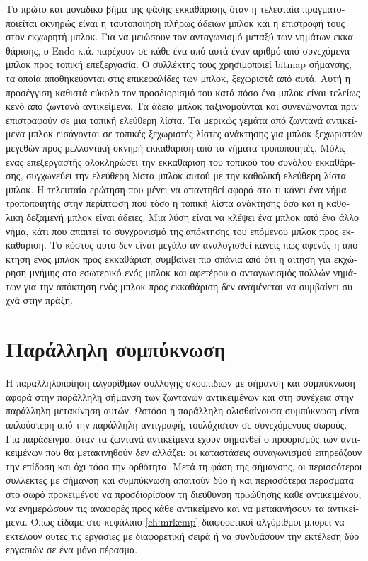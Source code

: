 \begin{greek}
Το πρώτο και μοναδικό βήμα της φάσης εκκαθάρισης όταν η τελευταία
πραγματοποιείται οκνηρώς είναι η ταυτοποίηση πλήρως άδειων μπλοκ
και η επιστροφή τους στον εκχωρητή μπλοκ. Για να μειώσουν τον
ανταγωνισμό μεταξύ των νημάτων εκκαθάρισης, ο Endo κ.ά. \cite{DBLP:conf/sc/EndoTY97}
παρέχουν σε κάθε ένα από αυτά έναν αριθμό από συνεχόμενα μπλοκ
προς τοπική επεξεργασία. Ο συλλέκτης τους χρησιμοποιεί bitmap
σήμανσης, τα οποία αποθηκεύονται στις επικεφαλίδες των μπλοκ,
ξεχωριστά από αυτά. Αυτή η προσέγγιση καθιστά εύκολο τον προσδιορισμό
του κατά πόσο ένα μπλοκ είναι τελείως κενό από ζωντανά αντικείμενα.
Τα άδεια μπλοκ ταξινομούνται και συνενώνονται πριν επιστραφούν
σε μια τοπική ελεύθερη λίστα. Τα μερικώς γεμάτα από ζωντανά
αντικείμενα μπλοκ εισάγονται σε τοπικές ξεχωριστές λίστες ανάκτησης
για μπλοκ ξεχωριστών μεγεθών προς μελλοντική οκνηρή εκκαθάριση
από τα νήματα τροποποιητές. Μόλις ένας επεξεργαστής ολοκληρώσει
την εκκαθάριση του τοπικού του συνόλου εκκαθάρισης, συγχωνεύει
την ελεύθερη λίστα μπλοκ αυτού με την καθολική ελεύθερη λίστα
μπλοκ. Η τελευταία ερώτηση που μένει να απαντηθεί αφορά στο
τι κάνει ένα νήμα τροποποιητής στην περίπτωση που τόσο η τοπική
λίστα ανάκτησης όσο και η καθολική δεξαμενή μπλοκ είναι άδειες.
Μια λύση είναι να κλέψει ένα μπλοκ από ένα άλλο νήμα, κάτι που
απαιτεί το συγχρονισμό της απόκτησης του επόμενου μπλοκ προς
εκκαθάριση. Το κόστος αυτό δεν είναι μεγάλο αν αναλογισθεί κανείς
πώς αφενός η απόκτηση ενός μπλοκ προς εκκαθάριση συμβαίνει πιο
σπάνια από ότι η αίτηση για εκχώρηση μνήμης στο εσωτερικό ενός
μπλοκ και αφετέρου ο ανταγωνισμός πολλών νημάτων για την απόκτηση
ενός μπλοκ προς εκκαθάριση δεν αναμένεται να συμβαίνει συχνά
στην πράξη.

\section{Παράλληλη συμπύκνωση}
Η παραλληλοποίηση αλγορίθμων συλλογής σκουπιδιών με σήμανση
και συμπύκνωση αφορά στην παράλληλη σήμανση των ζωντανών αντικειμένων
και στη συνέχεια στην παράλληλη μετακίνηση αυτών. Ωστόσο η παράλληλη
ολισθαίνουσα συμπύκνωση είναι απλούστερη από την παράλληλη
αντιγραφή, τουλάχιστον σε συνεχόμενους σωρούς. Για παράδειγμα,
όταν τα ζωντανά αντικείμενα έχουν σημανθεί ο προορισμός των αντικειμένων
που θα μετακινηθούν δεν αλλάζει: οι καταστάσεις συναγωνισμού
επηρεάζουν την επίδοση και όχι τόσο την ορθότητα. Μετά τη
φάση της σήμανσης, οι περισσότεροι συλλέκτες με σήμανση και
συμπύκνωση απαιτούν δύο ή και περισσότερα περάσματα στο σωρό
προκειμένου να προσδιορίσουν τη διεύθυνση πρoώθησης κάθε αντικειμένου,
να ενημερώσουν τις αναφορές προς κάθε αντικείμενο και να μετακινήσουν
τα αντικείμενα. Όπως είδαμε στο κεφάλαιο \ref{ch:mrkcmp}
διαφορετικοί αλγόριθμοι μπορεί να εκτελούν αυτές τις εργασίες
με διαφορετική σειρά ή να συνδυάσουν την εκτέλεση δύο εργασιών
σε ένα μόνο πέρασμα.


\end{greek}
